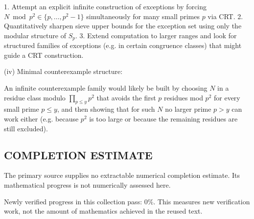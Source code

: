 1. Attempt an explicit infinite construction of exceptions by forcing $N\bmod p^2\in\{p,\dots,p^2-1\}$ simultaneously for many small primes $p$ via CRT.
2. Quantitatively sharpen sieve upper bounds for the exception set using only the modular structure of $S_p$.
3. Extend computation to larger ranges and look for structured families of exceptions (e.g. in certain congruence classes) that might guide a CRT construction.

(iv) Minimal counterexample structure:

An infinite counterexample family would likely be built by choosing $N$ in a residue class modulo $\prod_{p\le y} p^2$ that avoids the first $p$ residues mod $p^2$ for every small prime $p\le y$, and then showing that for such $N$ no larger prime $p>y$ can work either (e.g. because $p^2$ is too large or because the remaining residues are still excluded).




\subsection*{COMPLETION ESTIMATE}
The primary source supplies no extractable numerical completion estimate. Its mathematical progress is not numerically assessed here.

Newly verified progress in this collection pass: $0\%$. This measures new verification work, not the amount of mathematics achieved in the reused text.
